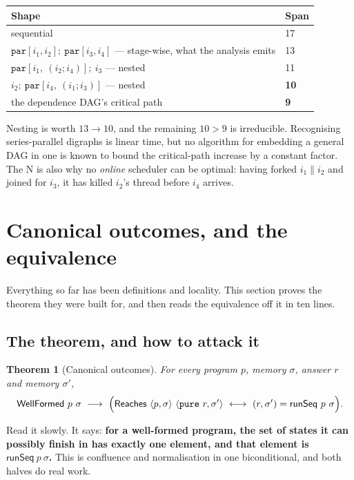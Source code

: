 \documentclass[11pt,a4paper]{article}
\theoremstyle{definition}
\theoremstyle{plain}
\newtheorem{theorem}[definition]{Theorem}
\theoremstyle{remark}
\newcommand{\st}{\sigma}
\newcommand{\runSeq}{\mathsf{runSeq}}
\newcommand{\wf}{\mathsf{WellFormed}}
\newcommand{\Reaches}{\mathsf{Reaches}}
\begin{document}
\begin{center}\small
\begin{tabular}{@{}ll@{}}
\toprule
\textbf{Shape} & \textbf{Span} \\
\midrule
sequential                                       & 17 \\
$\texttt{par}[i_1,i_2];\ \texttt{par}[i_3,i_4]$ --- stage-wise, what the analysis emits & 13 \\
$\texttt{par}[i_1,\ (i_2;i_4)];\ i_3$ --- nested & 11 \\
$i_2;\ \texttt{par}[i_4,\ (i_1;i_3)]$ --- nested & \textbf{10} \\
the dependence DAG's critical path               & \textbf{9} \\
\bottomrule
\end{tabular}
\end{center}

Nesting is worth $13 \to 10$, and the remaining $10 > 9$ is irreducible. Recognising
series-parallel digraphs is linear time, but no algorithm for embedding a general DAG in one
is known to bound the critical-path increase by a constant factor. The N is also why no
\emph{online} scheduler can be optimal: having forked $i_1 \parallel i_2$ and joined for
$i_3$, it has killed $i_2$'s thread before $i_4$ arrives.

\section{Canonical outcomes, and the equivalence}\label{sec:canonical}

Everything so far has been definitions and locality. This section proves the theorem they
were built for, and then reads the equivalence off it in ten lines.

\subsection{The theorem, and how to attack it}\label{sec:canonical:strategy}

\begin{theorem}[Canonical outcomes]\label{thm:canonical}
For every program $p$, memory $\st$, answer $r$ and memory $\st'$,
\[
  \wf\ p\ \st
  \ \longrightarrow\
  \Bigl( \Reaches\ \langle p, \st\rangle\ \langle \texttt{pure}\ r, \st'\rangle
  \ \longleftrightarrow\ (r, \st') = \runSeq\ p\ \st \Bigr) .
\]
\end{theorem}

Read it slowly. It says: \textbf{for a well-formed program, the set of states it can possibly
finish in has exactly one element, and that element is $\runSeq\ p\ \st$.} This is confluence
and normalisation in one biconditional, and both halves do real work.
\end{document}
